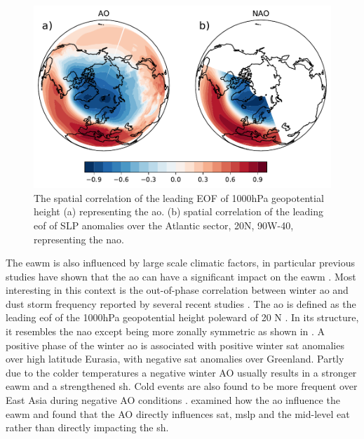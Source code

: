 \begin{figure}[htpb]
    \centering
    \includegraphics[width=\textwidth]{texfiles/figs/EOF_AO_NAO.pdf}
    \caption{The spatial correlation of the leading EOF of 1000hPa geopotential height (a) representing the \acrshort{ao}. (b)  spatial correlation of the leading \acrshort{eof}  of SLP anomalies over the Atlantic sector, 20\degree N, 90\degree W-40\degree, representing the \acrshort{nao}.}
    \label{fig:EOF_NAO_AO}
\end{figure}
The \acrshort{eawm} is also influenced by large scale climatic factors, in particular previous studies have shown that the \acrfull{ao} can have a significant impact on the \acrshort{eawm} \parencite{wu2002winter,park2011relationship}. Most interesting in this context is the out-of-phase correlation between winter \acrshort{ao} and dust storm frequency reported by several recent studies \parencite{gong2006east,mao2011influence,liu2018influence}. 
The \acrshort{ao} is defined as the leading \acrfull{eof} of the 1000hPa geopotential height poleward of 20 \degree N \parencite{thompson1998arctic}. 
In its structure, it resembles the \acrfull{nao} except being more zonally symmetric as shown in . 
A positive phase of the winter \acrshort{ao} is associated with positive winter \acrfull{sat} anomalies over high latitude Eurasia, with negative \acrshort{sat} anomalies over Greenland. 
Partly due to the colder temperatures a negative winter AO usually results in a stronger \acrshort{eawm} and a strengthened \acrshort{sh}.  
Cold events are also found to be more frequent over East Asia during negative AO conditions \parencite{he2017impact}.
\textcite{wu2002winter} examined how the \acrshort{ao} influence the \acrshort{eawm} and found that the AO directly influences  \acrshort{sat}, \acrshort{mslp} and the mid-level \acrshort{eat} rather than directly impacting the \acrshort{sh}.

